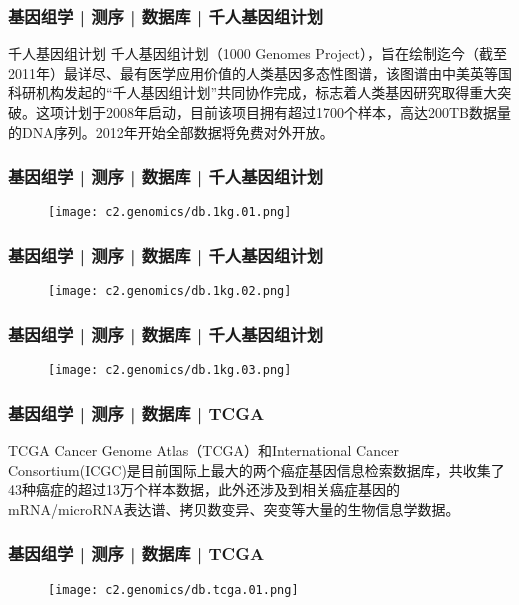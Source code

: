 \begin{frame}
  \frametitle{基因组学 | 测序 | 数据库 | 千人基因组计划}
  \begin{block}{千人基因组计划}
千人基因组计划（1000 Genomes Project），旨在绘制迄今（截至2011年）最详尽、最有医学应用价值的人类基因多态性图谱，该图谱由中美英等国科研机构发起的“千人基因组计划”共同协作完成，标志着人类基因研究取得重大突破。这项计划于2008年启动，目前该项目拥有超过1700个样本，高达200TB数据量的DNA序列。2012年开始全部数据将免费对外开放。
  \end{block}
\end{frame}
    
\begin{frame}
  \frametitle{基因组学 | 测序 | 数据库 | 千人基因组计划}
  \begin{figure}
    \centering
    \texttt{[image: c2.genomics/db.1kg.01.png]}
  \end{figure}
\end{frame}
    
\begin{frame}
  \frametitle{基因组学 | 测序 | 数据库 | 千人基因组计划}
  \begin{figure}
    \centering
    \texttt{[image: c2.genomics/db.1kg.02.png]}
  \end{figure}
\end{frame}
    
\begin{frame}
  \frametitle{基因组学 | 测序 | 数据库 | 千人基因组计划}
  \begin{figure}
    \centering
    \texttt{[image: c2.genomics/db.1kg.03.png]}
  \end{figure}
\end{frame}
    
\begin{frame}
  \frametitle{基因组学 | 测序 | 数据库 | TCGA}
  \begin{block}{TCGA}
Cancer Genome Atlas（TCGA）和International Cancer Consortium(ICGC)是目前国际上最大的两个癌症基因信息检索数据库，共收集了43种癌症的超过13万个样本数据，此外还涉及到相关癌症基因的mRNA/microRNA表达谱、拷贝数变异、突变等大量的生物信息学数据。
  \end{block}
\end{frame}

\begin{frame}
  \frametitle{基因组学 | 测序 | 数据库 | TCGA}
  \begin{figure}
    \centering
    \texttt{[image: c2.genomics/db.tcga.01.png]}
  \end{figure}
\end{frame}
    
